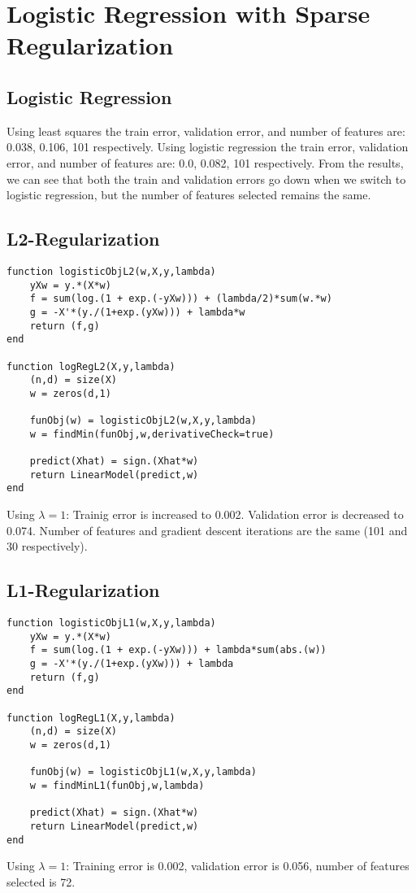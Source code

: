 \documentclass{article}
\begin{document}
\section{Logistic Regression with Sparse Regularization}

\subsection{Logistic Regression}

Using least squares the train error, validation error, and number of features are: 0.038, 0.106, 101 respectively. Using logistic regression the train error, validation error, and number of features are: 0.0, 0.082, 101 respectively. From the results, we can see that both the train and validation errors go down when we switch to logistic regression, but the number of features selected remains the same.

\subsection{L2-Regularization}

\begin{verbatim}
function logisticObjL2(w,X,y,lambda)
    yXw = y.*(X*w)
    f = sum(log.(1 + exp.(-yXw))) + (lambda/2)*sum(w.*w)
    g = -X'*(y./(1+exp.(yXw))) + lambda*w
    return (f,g)
end

function logRegL2(X,y,lambda)
    (n,d) = size(X)
    w = zeros(d,1)

    funObj(w) = logisticObjL2(w,X,y,lambda)
    w = findMin(funObj,w,derivativeCheck=true)

    predict(Xhat) = sign.(Xhat*w)
    return LinearModel(predict,w)
end
\end{verbatim}
Using $\lambda = 1$:
Trainig error is increased to 0.002.
Validation error is decreased to 0.074.
Number of features and gradient descent iterations are the same (101 and 30 respectively).

\subsection{L1-Regularization}

\begin{verbatim}
function logisticObjL1(w,X,y,lambda)
    yXw = y.*(X*w)
    f = sum(log.(1 + exp.(-yXw))) + lambda*sum(abs.(w))
    g = -X'*(y./(1+exp.(yXw))) + lambda
    return (f,g)
end

function logRegL1(X,y,lambda)
    (n,d) = size(X)
    w = zeros(d,1)

    funObj(w) = logisticObjL1(w,X,y,lambda)
    w = findMinL1(funObj,w,lambda)

    predict(Xhat) = sign.(Xhat*w)
    return LinearModel(predict,w)
end
\end{verbatim}
 Using $\lambda = 1$: Training error is 0.002, validation error is 0.056, number of features selected is 72.
\end{document}
